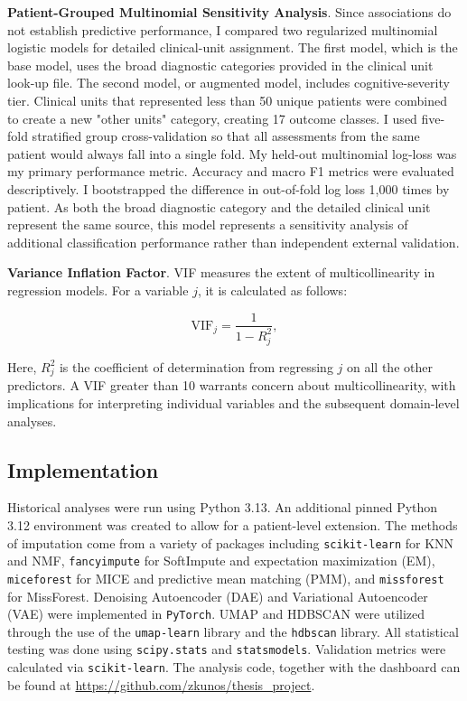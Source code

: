\textbf{Patient-Grouped Multinomial Sensitivity Analysis}. Since associations do not establish predictive performance, I compared two regularized multinomial logistic models for detailed clinical-unit assignment. The first model, which is the base model, uses the broad diagnostic categories provided in the clinical unit look-up file. The second model, or augmented model, includes cognitive-severity tier. Clinical units that represented less than 50 unique patients were combined to create a new "other units" category, creating 17 outcome classes. I used five-fold stratified group cross-validation so that all assessments from the same patient would always fall into a single fold. My held-out multinomial log-loss was my primary performance metric. Accuracy and macro F1 metrics were evaluated descriptively. I bootstrapped the difference in out-of-fold log loss 1,000 times by patient. As both the broad diagnostic category and the detailed clinical unit represent the same source, this model represents a sensitivity analysis of additional classification performance rather than independent external validation.

\textbf{Variance Inflation Factor}. VIF measures the extent of multicollinearity in regression models. For a variable \(j\), it is calculated as follows:

\begin{equation}\label{eq:vif}
\mathrm{VIF}_j=\frac{1}{1-R_j^2},
\end{equation}

Here, \(R_j^2\) is the coefficient of determination from regressing \(j\) on all the other predictors. A VIF greater than 10 warrants concern about multicollinearity, with implications for interpreting individual variables and the subsequent domain-level analyses.

\subsection{Implementation}

\begin{sloppypar}
Historical analyses were run using Python 3.13. An additional pinned Python 3.12 environment was created to allow for a patient-level extension. The methods of imputation come from a variety of packages including \texttt{scikit-learn} for KNN and NMF, \texttt{fancyimpute} for SoftImpute and expectation maximization (EM), \texttt{miceforest} for MICE and predictive mean matching (PMM), and \texttt{missforest} for MissForest. Denoising Autoencoder (DAE) and Variational Autoencoder (VAE) were implemented in \texttt{PyTorch}. UMAP and HDBSCAN were utilized through the use of the \texttt{umap-learn} library and the \texttt{hdbscan} library. All statistical testing was done using \texttt{scipy.stats} and \texttt{statsmodels}. Validation metrics were calculated via \texttt{scikit-learn}. The analysis code, together with the dashboard can be found at \url{https://github.com/zkunos/thesis_project}.
\end{sloppypar}



